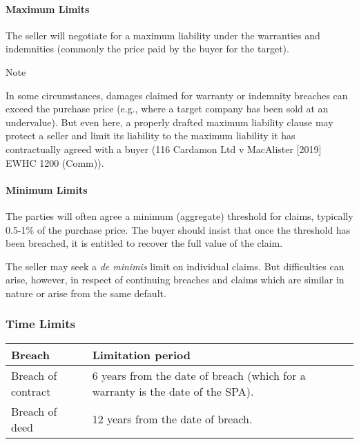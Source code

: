 \documentclass[
]{article}
\newenvironment{env-48e9bfc8-c3dd-4504-a5fa-3b34b9a27ccf}
{
    \savenotes\tcolorbox[blanker,breakable,left=5pt,borderline west={2pt}{-4pt}{blue}]
}
{
    \endtcolorbox\spewnotes
}
\begin{document}
\hypertarget{maximum-limits}{%
\paragraph{Maximum Limits}\label{maximum-limits}}

The seller will negotiate for a maximum liability under the warranties
and indemnities (commonly the price paid by the buyer for the target).

\begin{env-48e9bfc8-c3dd-4504-a5fa-3b34b9a27ccf}

Note

In some circumstances, damages claimed for warranty or indemnity
breaches can exceed the purchase price (e.g., where a target company has
been sold at an undervalue). But even here, a properly drafted maximum
liability clause may protect a seller and limit its liability to the
maximum liability it has contractually agreed with a buyer (116 Cardamon
Ltd v MacAlister {[}2019{]} EWHC 1200 (Comm)).

\end{env-48e9bfc8-c3dd-4504-a5fa-3b34b9a27ccf}

\hypertarget{minimum-limits}{%
\paragraph{Minimum Limits}\label{minimum-limits}}

The parties will often agree a minimum (aggregate) threshold for claims,
typically 0.5-1\% of the purchase price. The buyer should insist that
once the threshold has been breached, it is entitled to recover the full
value of the claim.

The seller may seek a \emph{de minimis} limit on individual claims. But
difficulties can arise, however, in respect of continuing breaches and
claims which are similar in nature or arise from the same default.

\hypertarget{time-limits}{%
\subsubsection{Time Limits}\label{time-limits}}

\begin{longtable}[]{@{}ll@{}}
\toprule()
Breach & Limitation period \\
\midrule()
\endhead
Breach of contract & 6 years from the date of breach (which for a
warranty is the date of the SPA). \\
Breach of deed & 12 years from the date of breach. \\
\bottomrule()
\end{longtable}
\end{document}
